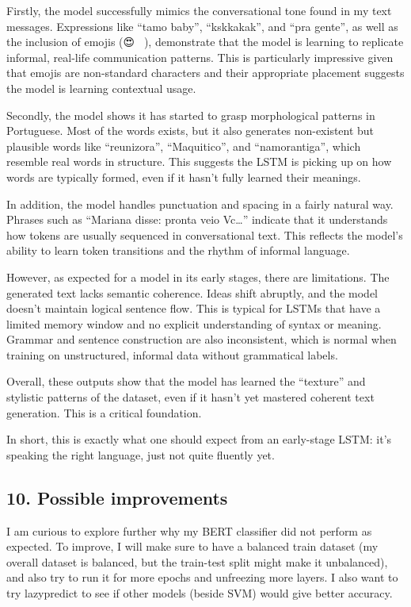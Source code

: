 \documentclass[11pt]{article}
\begin{document}
Firstly, the model successfully mimics the conversational tone found in
my text messages. Expressions like ``tamo baby'', ``kskkakak'', and
``pra gente'', as well as the inclusion of emojis (😍🙌🏼🤡), demonstrate
that the model is learning to replicate informal, real-life
communication patterns. This is particularly impressive given that
emojis are non-standard characters and their appropriate placement
suggests the model is learning contextual usage.

Secondly, the model shows it has started to grasp morphological patterns
in Portuguese. Most of the words exists, but it also generates
non-existent but plausible words like ``reunizora'', ``Maquitico'', and
``namorantiga'', which resemble real words in structure. This suggests
the LSTM is picking up on how words are typically formed, even if it
hasn't fully learned their meanings.

In addition, the model handles punctuation and spacing in a fairly
natural way. Phrases such as ``Mariana disse: pronta veio Vc\ldots{}''
indicate that it understands how tokens are usually sequenced in
conversational text. This reflects the model's ability to learn token
transitions and the rhythm of informal language.

However, as expected for a model in its early stages, there are
limitations. The generated text lacks semantic coherence. Ideas shift
abruptly, and the model doesn't maintain logical sentence flow. This is
typical for LSTMs that have a limited memory window and no explicit
understanding of syntax or meaning. Grammar and sentence construction
are also inconsistent, which is normal when training on unstructured,
informal data without grammatical labels.

Overall, these outputs show that the model has learned the ``texture''
and stylistic patterns of the dataset, even if it hasn't yet mastered
coherent text generation. This is a critical foundation.

In short, this is exactly what one should expect from an early-stage
LSTM: it's speaking the right language, just not quite fluently yet.

    \subsection{10. Possible improvements}\label{possible-improvements}

I am curious to explore further why my BERT classifier did not perform
as expected. To improve, I will make sure to have a balanced train
dataset (my overall dataset is balanced, but the train-test split might
make it unbalanced), and also try to run it for more epochs and
unfreezing more layers. I also want to try lazypredict to see if other
models (beside SVM) would give better accuracy.
\end{document}

